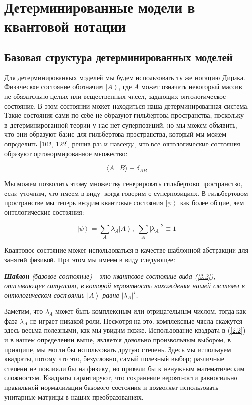 \documentclass[main.tex]{subfiles}
\begin{document}
\section{Детерминированные модели в квантовой нотации}\label{ch2}

\subsection{Базовая структура детерминированных моделей}\label{ch2.1}

Для детерминированных моделей мы будем использовать ту же нотацию Дирака. Физическое состояние обозначим $\left|A\right>$, где $A$ может означать некоторый массив не обязательно целых или вещественных чисел, задающих онтологическое состояние. В этом состоянии может находиться наша детерминированная система. Такие состояния сами по себе не образуют гильбертова пространства, поскольку в детерминированной теории у нас нет суперпозиций, но мы можем объявить, что они образуют базис для гильбертова пространства, который мы можем определить [102, 122], решив раз и навсегда, что все онтологические состояния образуют ортонормированное множество: 

\begin{equation}\label{2.1}
	\langle A\mid B\rangle  \equiv \delta_{AB}
\end{equation}

Мы можем позволить этому множеству генерировать гильбертово пространство, если уточним, что имеем в виду, когда говорим о суперпозициях. В гильбертовом пространстве мы теперь вводим квантовые состояния $\left|\psi\right>$ как более общие, чем онтологические состояния:

\begin{equation}\label{2.2}
	 \left|\psi\right> = \sum_A \lambda_A \left|A\right>, \,\,
	 \sum_A |\lambda_A|^2 \equiv 1
\end{equation}

Квантовое состояние может использоваться в качестве шаблонной абстракции для занятий физикой. При этом мы имеем в виду следующее: 

\textit{\textbf{Шаблон} (базовое состояние) - это квантовое состояние вида (\ref{2.2}), описывающее ситуацию, в которой вероятность нахождения нашей системы в онтологическом состоянии $\left|A\right>$ равна $|\lambda_A|^2$. }

Заметим, что $\lambda_A$ может быть комплексным или отрицательным числом, тогда как фаза $\lambda_A$ не играет никакой роли. Несмотря на это, комплексные числа окажутся здесь весьма полезными, как мы увидим позже. Использование квадрата в (\ref{2.2}) и в нашем определении выше, является довольно произвольным выбором; в принципе, мы могли бы использовать другую степень. Здесь мы используем квадраты, потому что это, безусловно, самый полезный выбор; различные степени не повлияли бы на физику, но привели бы к ненужным математическим сложностям. Квадраты гарантируют, что сохранение вероятности равносильно правильной нормализации базового состояния и позволяет использовать унитарные матрицы в наших преобразованиях.  
\end{document}
